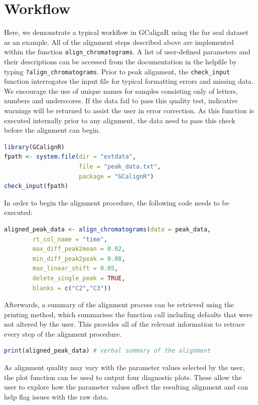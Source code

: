 \documentclass[10pt,letterpaper]{article}
\begin{document}
\section*{Workflow}
Here, we demonstrate a typical workflow in GCalignR using the fur seal dataset as an example. All of the alignment steps described above are implemented within the function \texttt{align\_chromatograms}. A list of user-defined parameters and their descriptions can be accessed from the documentation in the helpfile by typing \texttt{?align\_chromatograms}. Prior to peak alignment, the \texttt{check\_input} function interrogates the input file for typical formatting errors and missing data. We encourage the use of unique names for samples consisting only of letters, numbers and underscores. If the data fail to pass this quality test, indicative warnings will be returned to assist the user in error correction. As this function is executed internally prior to any alignment, the data need to pass this check before the alignment can begin.


\begin{lstlisting}[language=R]
library(GCalignR)
fpath <- system.file(dir = "extdata",
                     file = "peak_data.txt",
                     package = "GCalignR")
check_input(fpath) 
\end{lstlisting}

In order to begin the alignment procedure, the following code needs to be executed:

\begin{lstlisting}[language=R]
aligned_peak_data <- align_chromatograms(data = peak_data,
        rt_col_name = "time",
        max_diff_peak2mean = 0.02, 
        min_diff_peak2peak = 0.08, 
        max_linear_shift = 0.05, 
        delete_single_peak = TRUE, 
        blanks = c("C2","C3")) 
\end{lstlisting}

Afterwards, a summary of the alignment process can be retrieved using the printing method, which summarises the function call including defaults that were not altered by the user. This provides all of the relevant information to retrace every step of the alignment procedure.

\begin{lstlisting}[language=R]
print(aligned_peak_data) # verbal summary of the alignment
\end{lstlisting}

As alignment quality may vary with the parameter values selected by the user, the plot function can be used to output four diagnostic plots.  These allow the user to explore how the parameter values affect the resulting alignment and can help flag issues with the raw data.
\end{document}
